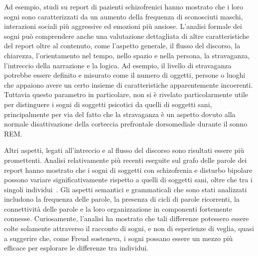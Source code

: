 Ad esempio, studi su report di pazienti schizofrenici hanno mostrato che i loro sogni sono
caratterizzati da un aumento della frequenza di sconosciuti maschi, interazioni sociali più aggressive ed
emozioni più ansiose. %
L'analisi formale dei sogni può comprendere anche una valutazione dettagliata di altre caratteristiche del report
oltre al contenuto, come l'aspetto generale, il flusso del discorso, la chiarezza, l'orientamento nel tempo,
nello spazio e nella persona, la stravaganza, l'intreccio della narrazione e la logica.
Ad esempio, il livello di stravaganza potrebbe essere definito e misurato come il numero di oggetti, persone o
luoghi che appaiono avere un certo insieme di caratteristiche apparentemente incoerenti.
Tuttavia questo parametro in particolare, non si è rivelato particolarmente utile per distinguere i sogni di
soggetti psicotici da quelli di soggetti sani, principalmente per via del fatto che la stravaganza è un aspetto
dovuto alla normale disattivazione della corteccia prefrontale dorsomediale durante il sonno REM.

Altri aspetti, legati all'intreccio e al flusso del discorso sono risultati essere più promettenti.
Analisi relativamente più recenti eseguite sul grafo delle parole dei report hanno mostrato che i sogni di soggetti con
schizofrenia e disturbo bipolare possono variare significativamente rispetto a quelli di soggetti sani,
oltre che tra i singoli individui~\cite{mota2014graph}.
Gli aspetti semantici e grammaticali che sono stati analizzati includono la frequenza delle parole, la presenza di
cicli di parole ricorrenti, la connettività delle parole e la loro organizzazione in componenti
fortemente connesse.
Curiosamente, l'analisi ha mostrato che tali differenze potessero essere colte solamente attraverso il racconto di
sogni, e non di esperienze di veglia, quasi a suggerire che, come Freud sosteneva, i sogni possano essere un mezzo più
efficace per esplorare le differenze tra individui.